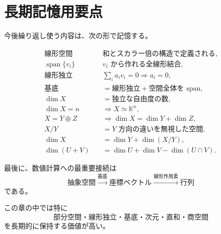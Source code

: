 \documentclass[a4paper,11pt]{ltjsarticle}
\newcommand{\K}{\mathbb{K}}
\newcommand{\Span}{\operatorname{span}}
\begin{document}
\section{長期記憶用要点}

今後繰り返し使う内容は、次の形で記憶する。

\begin{align*}
\boxed{\text{線形空間}}\quad
&\text{和とスカラー倍の構造で定義される},\\[0.5em]
\boxed{\Span\{v_i\}}\quad
&\text{$v_i$ から作れる全線形結合},\\[0.5em]
\boxed{\text{線形独立}}\quad
&\sum_i a_i v_i=0\Rightarrow a_i=0,\\[0.5em]
\boxed{\text{基底}}\quad
&=\text{線形独立}+\text{空間全体を span},\\[0.5em]
\boxed{\dim X}\quad
&=\text{独立な自由度の数},\\[0.5em]
\boxed{\dim X=n}\quad
&\Rightarrow X\simeq\K^n,\\[0.5em]
\boxed{X=Y\oplus Z}\quad
&\Rightarrow \dim X=\dim Y+\dim Z,\\[0.5em]
\boxed{X/Y}\quad
&=\text{$Y$ 方向の違いを無視した空間},\\[0.5em]
\boxed{\dim X}\quad
&=\dim Y+\dim(X/Y),\\[0.5em]
\boxed{\dim(U+V)}\quad
&=\dim U+\dim V-\dim(U\cap V).
\end{align*}

最後に、数値計算への最重要接続は
\[
\boxed{
\text{抽象空間}
\xrightarrow{\text{基底}}
\text{座標ベクトル}
\xrightarrow{\text{線形作用素}}
\text{行列}
}
\]
である。

この章の中では特に
\[
\boxed{
\text{部分空間・線形独立・基底・次元・直和・商空間}
}
\]
を長期的に保持する価値が高い。
\end{document}
